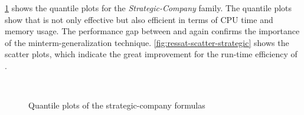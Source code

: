 \cref{fig:ressat-quantile-strategic} shows the quantile plots for the \textit{Strategic-Company} family.
The quantile plots show that \ressat is not only effective but also efficient
in terms of CPU time and memory usage.
The performance gap between \ressat and \ressatb again confirms the importance of the minterm-generalization technique.
\cref{fig:ressat-scatter-strategic} shows the scatter plots,
which indicate the great improvement for the run-time efficiency of \ressat.

\begin{figure}[hp]
    \centering
    \\
    \caption{Quantile plots of the strategic-company formulas}
    \label{fig:ressat-quantile-strategic}
\end{figure}

